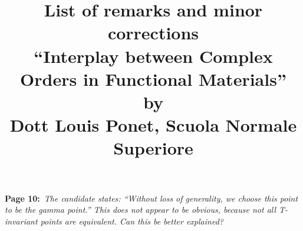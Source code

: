 \documentclass[a4, UTF8]{article}
\begin{document}
\title{List of remarks and minor corrections\\
\large ``Interplay between Complex Orders in Functional Materials''\\
by\\
Dott Louis Ponet, Scuola Normale Superiore}
\date{}
\maketitle
{\bf Page 10:}~{\it The candidate states: ``Without loss of generality, we choose this point to be the gamma
point.'' This does not appear to be obvious, because not all T-invariant points are equivalent. Can
this be better explained?}
\\\\
\end{document}
